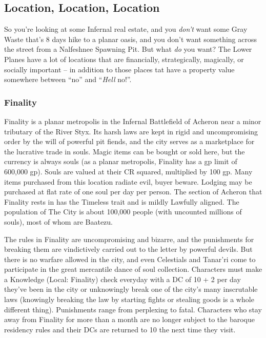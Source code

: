 \subsection{Location, Location, Location}

So you're looking at some Infernal real estate, and you \textit{don't} want some Gray Waste that's 8 days hike to a planar oasis, and you don't want something across the street from a Nalfeshnee Spawning Pit. But what \textit{do} you want? The Lower Planes have a lot of locations that are financially, strategically, magically, or socially important -- in addition to those places tat have a property value somewhere between ``no'' and ``\textit{Hell} no!''.

\subsubsection{Finality}

Finality is a planar metropolis in the Infernal Battlefield of Acheron near a minor tributary of the River Styx. Its harsh laws are kept in rigid and uncompromising order by the will of powerful pit fiends, and the city serves as a marketplace for the lucrative trade in souls. Magic items can be bought or sold here, but the currency is always souls (as a planar metropolis, Finality has a gp limit of 600,000 gp). Souls are valued at their CR squared, multiplied by 100 gp. Many items purchased from this location radiate evil, buyer beware. Lodging may be purchased at flat rate of one soul per day per person. The section of Acheron that Finality rests in has the Timeless trait and is mildly Lawfully aligned. The population of The City is about 100,000 people (with uncounted millions of souls), most of whom are Baatezu.

The rules in Finality are uncompromising and bizarre, and the punishments for breaking them are vindictively carried out to the letter by powerful devils. But there is no warfare allowed in the city, and even Celestials and Tanar'ri come to participate in the great mercantile dance of soul collection. Characters must make a Knowledge (Local: Finality) check everyday with a DC of 10 + 2 per day they've been in the city or unknowingly break one of the city's many inscrutable laws (knowingly breaking the law by starting fights or stealing goods is a whole different thing). Punishments range from perplexing to fatal. Characters who stay away from Finality for more than a month are no longer subject to the baroque residency rules and their DCs are returned to 10 the next time they visit.

